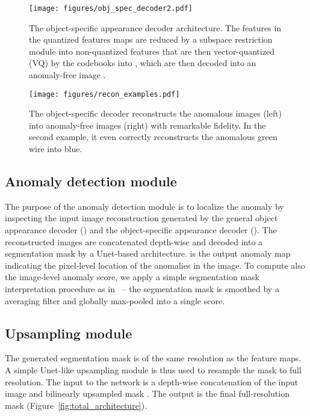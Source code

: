 \documentclass[runningheads]{llncs}
\begin{document}
\begin{figure}
\centering
  \texttt{[image: figures/obj\_spec\_decoder2.pdf]}
\caption{
The object-specific appearance decoder architecture. 
The features in the quantized features maps  are reduced by a subspace restriction module into non-quantized features  that are then vector-quantized (VQ) by the codebooks  into , which are then decoded into an anomaly-free image .
}
\label{fig:reconstructive}
\end{figure}

\begin{figure}
\centering
  \texttt{[image: figures/recon\_examples.pdf]}
\caption{
The object-specific decoder reconstructs the anomalous images (left) into anomaly-free images (right) with remarkable fidelity.
In the second example, it even correctly reconstructs the anomalous green wire into blue.
}
\label{fig:objspecrecon}
\end{figure}

\subsection{Anomaly detection module} \label{sec:discriminative}

The purpose of the anomaly detection module is to localize the anomaly by inspecting the input image reconstruction generated by the general object appearance decoder () and the object-specific appearance decoder (). The reconstructed images are concatenated depth-wise and decoded into a segmentation mask  by a Unet-based architecture.  is the output anomaly map indicating the pixel-level location of the anomalies in the image. To compute also the image-level anomaly score, we apply a simple segmentation mask interpretation procedure as in~\cite{zavrtanik2020riad} -- the segmentation mask is smoothed by a  averaging filter and globally max-pooled into a single score.


\subsection{Upsampling module} \label{sec:upsampling}

The generated segmentation mask   is of the same resolution as the feature maps.
A simple Unet-like upsampling module is thus used to resample the mask to full resolution. The input to the network is a depth-wise concatenation of the input image   and bilinearly upsampled mask  . The output is the final full-resolution mask   (Figure~\ref{fig:total_architecture}).
 
\end{document}
